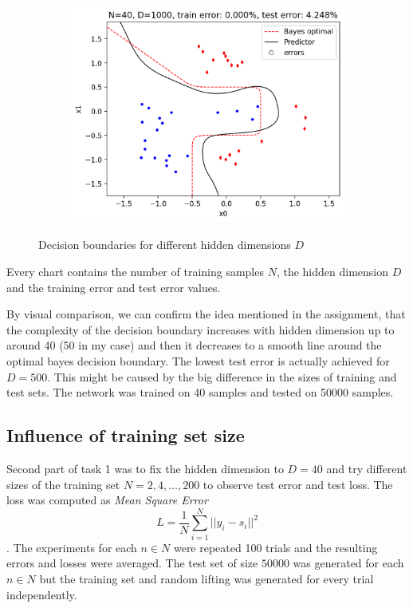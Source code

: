 \documentclass[a4paper,11pt]{article}
\begin{document}
\begin{figure}[ht]
\begin{subfigure}[b]{0.3\textwidth}
        \includegraphics[width=\textwidth]{../boundary/1000.png}
    \end{subfigure}
    \caption{Decision boundaries for different hidden dimensions $D$}
\end{figure}

Every chart contains the number of training samples $N$, the hidden dimension $D$ and the training error and test error values.

By visual comparison, we can confirm the idea mentioned in the assignment, that the complexity of the decision boundary increases with hidden dimension up to around 40 (50 in my case) and then it decreases to a smooth line around the optimal bayes decision boundary.
The lowest test error is actually achieved for $D=500$.
This might be caused by the big difference in the sizes of training and test sets.
The network was trained on 40 samples and tested on 50000 samples.

\subsection{Influence of training set size}
Second part of task 1 was to fix the hidden dimension to $D=40$ and try different sizes of the training set $N=2,4,\dots,200$ to observe test error and test loss.
The loss was computed as \textit{Mean Square Error}
\[
    L = \frac{1}{N}\sum_{i=1}^{N}||y_i - s_i||^2
\].
The experiments for each $n \in N$ were repeated 100 trials and the resulting errors and losses were averaged.
The test set of size $50000$ was generated for each $n \in N$ but the training set and random lifting was generated for every trial independently.
\end{document}
